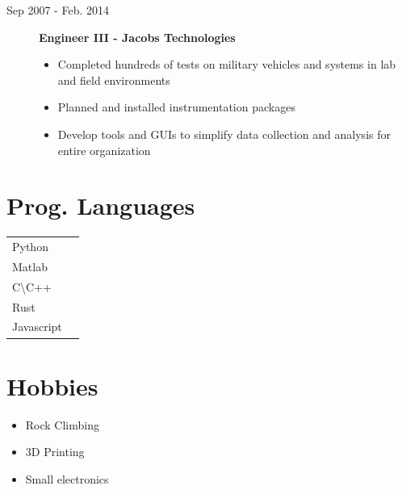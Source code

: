 \documentclass[a4paper,10pt]{article}
\begin{document}
\begin{adjustbox}{valign=t}
\begin{minipage}{0.6\textwidth}
\begin{description}
\item[\normalfont \textcolor{ColorOne}{Sep 2007 - Feb. 2014}] \textbf{Engineer III - Jacobs Technologies}
	\begin{itemize}[align=right, itemindent=-1.5em,leftmargin=0pt]
		\item Completed hundreds of tests on military vehicles and systems in lab and field environments
		\item Planned and installed instrumentation packages
		\item Develop tools and GUIs to simplify data collection and analysis for entire organization
	\end{itemize}
\end{description}

\MySkip

\begin{multicols}{2}
	\section*{Prog. Languages}
	\begin{tabular}{ll}
		Python  			& \SkillBull{$\bullet \bullet \bullet$}\\
		Matlab 		& \SkillBull{$\bullet \bullet \circ$}\\
		C\textbackslash C++        &\SkillBull{$\bullet \bullet \circ$}\\
		Rust  &\SkillBull{$\bullet \circ \circ$}\\
		Javascript  &\SkillBull{$\bullet \circ \circ$}\\
	\end{tabular}

	\vfill\null \columnbreak  %

	\section*{Hobbies}

	\begin{itemize}[noitemsep]
		\item Rock Climbing
		\item 3D Printing
		\item Small electronics
	\end{itemize}
\end{multicols}



\end{minipage}
\end{adjustbox}
\end{document}
